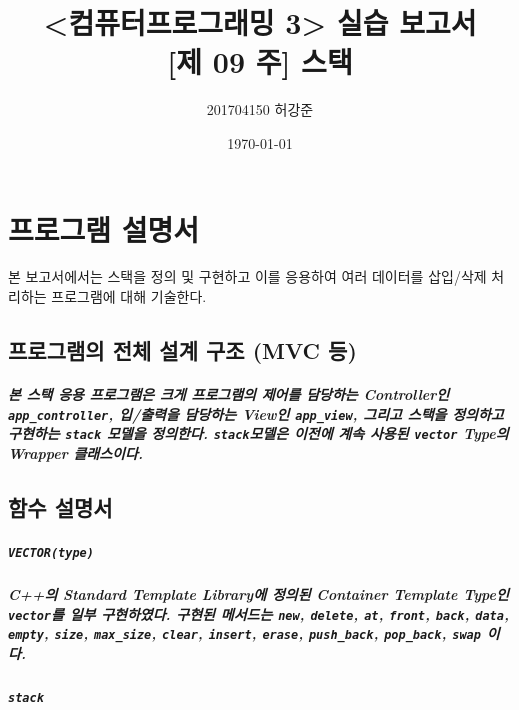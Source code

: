 \documentclass[UTF8]{report}
\title{%
    <컴퓨터프로그래밍 3> 실습 보고서 \\
    \large [제 09 주] 스택}
\author{201704150 허강준}
\date{\today}
\begin{document}
    \maketitle
    \tableofcontents

    \chapter{프로그램 설명서}
        본 보고서에서는 스택을 정의 및 구현하고 이를 응용하여 여러 데이터를 삽입/삭제 처리하는 프로그램에 대해 기술한다.

        \section{프로그램의 전체 설계 구조 (MVC 등)}

            \paragraph{%
                \normalfont 본 스택 응용 프로그램은 크게 프로그램의 제어를 담당하는 Controller인 \texttt{app\_controller}, 입/출력을 담당하는 View인 \texttt{app\_view}, 그리고 스택을 정의하고 구현하는 \texttt{stack} 모델을 정의한다. \texttt{stack}모델은 이전에 계속 사용된 \texttt{vector} Type의 Wrapper 클래스이다.
            }

        \section{함수 설명서}

            \paragraph{\texttt{VECTOR(type)}}
            \paragraph{%
                \normalfont C++의 Standard Template Library에 정의된 Container Template Type인 \texttt{vector}를 일부 구현하였다. 구현된 메서드는 \texttt{new},  \texttt{delete}, \texttt{at}, \texttt{front}, \texttt{back}, \texttt{data}, \texttt{empty}, \texttt{size}, \texttt{max\_size}, \texttt{clear}, \texttt{insert}, \texttt{erase}, \texttt{push\_back}, \texttt{pop\_back}, \texttt{swap} 이다.
            }

            \paragraph{\texttt{stack}}
\end{document}
